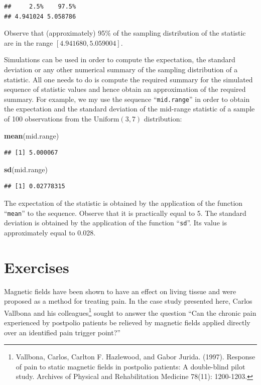 \documentclass[
]{krantz}
\makeatletter
\newenvironment{Shaded}{\begin{snugshade}}{\end{snugshade}}
\newcommand{\KeywordTok}[1]{\textcolor[rgb]{0.13,0.29,0.53}{\textbf{#1}}}
\newcommand{\NormalTok}[1]{#1}
\newenvironment{kframe}{%
\medskip{}
\setlength{\fboxsep}{.8em}
 \def\at@end@of@kframe{}%
 \ifinner\ifhmode%
  \def\at@end@of@kframe{\end{minipage}}%
  \begin{minipage}{\columnwidth}%
 \fi\fi%
 \def\FrameCommand##1{\hskip\@totalleftmargin \hskip-\fboxsep
 \colorbox{shadecolor}{##1}\hskip-\fboxsep
     \hskip-\linewidth \hskip-\@totalleftmargin \hskip\columnwidth}%
 \MakeFramed {\advance\hsize-\width
   \@totalleftmargin\z@ \linewidth\hsize
   \@setminipage}}%
 {\par\unskip\endMakeFramed%
 \at@end@of@kframe}
\renewenvironment{Shaded}{\begin{kframe}}{\end{kframe}}
\theoremstyle{definition}
\theoremstyle{definition}
\theoremstyle{definition}
\theoremstyle{remark}
\makeatother
\begin{document}
\begin{verbatim}
##     2.5%    97.5% 
## 4.941024 5.058786
\end{verbatim}

Observe that (approximately) 95\% of the sampling distribution of the
statistic are in the range \([4.941680, 5.059004]\).

Simulations can be used in order to compute the expectation, the
standard deviation or any other numerical summary of the sampling
distribution of a statistic. All one needs to do is compute the required
summary for the simulated sequence of statistic values and hence obtain
an approximation of the required summary. For example, we my use the
sequence ``\texttt{mid.range}'' in order to obtain the expectation and the
standard deviation of the mid-range statistic of a sample of 100
observations from the \(\mathrm{Uniform}(3,7)\) distribution:

\begin{Shaded}
\begin{Highlighting}[]
\KeywordTok{mean}\NormalTok{(mid.range)}
\end{Highlighting}
\end{Shaded}

\begin{verbatim}
## [1] 5.000067
\end{verbatim}

\begin{Shaded}
\begin{Highlighting}[]
\KeywordTok{sd}\NormalTok{(mid.range)}
\end{Highlighting}
\end{Shaded}

\begin{verbatim}
## [1] 0.02778315
\end{verbatim}

The expectation of the statistic is obtained by the application of the
function ``\texttt{mean}'' to the sequence. Observe that it is practically equal
to 5. The standard deviation is obtained by the application of the
function ``\texttt{sd}''. Its value is approximately equal to 0.028.

\hypertarget{exercises-4}{%
\section{Exercises}\label{exercises-4}}

Magnetic fields have been shown to have an effect on living tissue and
were proposed as a method for treating pain. In the case study presented
here, Carlos Vallbona and his colleagues\footnote{Vallbona, Carlos, Carlton F. Hazlewood, and Gabor Jurida. (1997).
  Response of pain to static magnetic fields in postpolio patients: A
  double-blind pilot study. Archives of Physical and Rehabilitation
  Medicine 78(11): 1200-1203.} sought to answer the
question ``Can the chronic pain experienced by postpolio patients be
relieved by magnetic fields applied directly over an identified pain
trigger point?''
\end{document}
